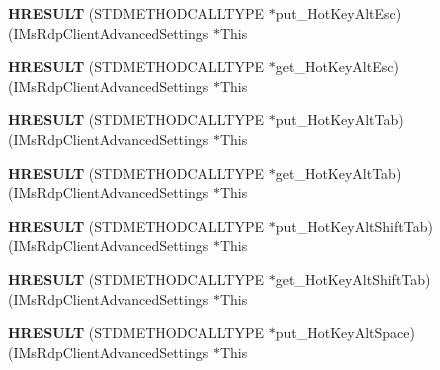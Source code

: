 \begin{DoxyCompactItemize}
{\bfseries H\+R\+E\+S\+U\+LT} (S\+T\+D\+M\+E\+T\+H\+O\+D\+C\+A\+L\+L\+T\+Y\+PE $\ast$put\+\_\+\+Hot\+Key\+Alt\+Esc)(I\+Ms\+Rdp\+Client\+Advanced\+Settings $\ast$This
\item 
\mbox{\label{struct_i_ms_rdp_client_advanced_settings_vtbl_af0b3e5be6158b9b51d9eb143f74f6f72}} 
{\bfseries H\+R\+E\+S\+U\+LT} (S\+T\+D\+M\+E\+T\+H\+O\+D\+C\+A\+L\+L\+T\+Y\+PE $\ast$get\+\_\+\+Hot\+Key\+Alt\+Esc)(I\+Ms\+Rdp\+Client\+Advanced\+Settings $\ast$This
\item 
\mbox{\label{struct_i_ms_rdp_client_advanced_settings_vtbl_a2706046b46534eb54d2806a72e4c41ac}} 
{\bfseries H\+R\+E\+S\+U\+LT} (S\+T\+D\+M\+E\+T\+H\+O\+D\+C\+A\+L\+L\+T\+Y\+PE $\ast$put\+\_\+\+Hot\+Key\+Alt\+Tab)(I\+Ms\+Rdp\+Client\+Advanced\+Settings $\ast$This
\item 
\mbox{\label{struct_i_ms_rdp_client_advanced_settings_vtbl_a32381ae37a025bbe8ef5721672a662ea}} 
{\bfseries H\+R\+E\+S\+U\+LT} (S\+T\+D\+M\+E\+T\+H\+O\+D\+C\+A\+L\+L\+T\+Y\+PE $\ast$get\+\_\+\+Hot\+Key\+Alt\+Tab)(I\+Ms\+Rdp\+Client\+Advanced\+Settings $\ast$This
\item 
\mbox{\label{struct_i_ms_rdp_client_advanced_settings_vtbl_a81fd0c28f1cc4364cc685f11163f8bfe}} 
{\bfseries H\+R\+E\+S\+U\+LT} (S\+T\+D\+M\+E\+T\+H\+O\+D\+C\+A\+L\+L\+T\+Y\+PE $\ast$put\+\_\+\+Hot\+Key\+Alt\+Shift\+Tab)(I\+Ms\+Rdp\+Client\+Advanced\+Settings $\ast$This
\item 
\mbox{\label{struct_i_ms_rdp_client_advanced_settings_vtbl_ac1dff4a88caebffc242d3d24009db1c9}} 
{\bfseries H\+R\+E\+S\+U\+LT} (S\+T\+D\+M\+E\+T\+H\+O\+D\+C\+A\+L\+L\+T\+Y\+PE $\ast$get\+\_\+\+Hot\+Key\+Alt\+Shift\+Tab)(I\+Ms\+Rdp\+Client\+Advanced\+Settings $\ast$This
\item 
\mbox{\label{struct_i_ms_rdp_client_advanced_settings_vtbl_a0849c4c50575b7b7b79145828de9e97b}} 
{\bfseries H\+R\+E\+S\+U\+LT} (S\+T\+D\+M\+E\+T\+H\+O\+D\+C\+A\+L\+L\+T\+Y\+PE $\ast$put\+\_\+\+Hot\+Key\+Alt\+Space)(I\+Ms\+Rdp\+Client\+Advanced\+Settings $\ast$This
\item 

\end{DoxyCompactItemize}
